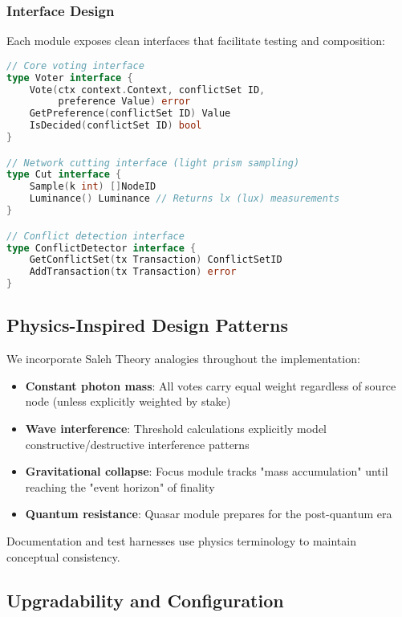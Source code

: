 \subsubsection{Interface Design}

Each module exposes clean interfaces that facilitate testing and composition:

\begin{lstlisting}[language=Go]
// Core voting interface
type Voter interface {
    Vote(ctx context.Context, conflictSet ID, 
         preference Value) error
    GetPreference(conflictSet ID) Value
    IsDecided(conflictSet ID) bool
}

// Network cutting interface (light prism sampling)
type Cut interface {
    Sample(k int) []NodeID
    Luminance() Luminance // Returns lx (lux) measurements
}

// Conflict detection interface
type ConflictDetector interface {
    GetConflictSet(tx Transaction) ConflictSetID
    AddTransaction(tx Transaction) error
}
\end{lstlisting}

\subsection{Physics-Inspired Design Patterns}

We incorporate Saleh Theory analogies throughout the implementation:

\begin{itemize}
\item \textbf{Constant photon mass}: All votes carry equal weight regardless of source node (unless explicitly weighted by stake)

\item \textbf{Wave interference}: Threshold calculations explicitly model constructive/destructive interference patterns

\item \textbf{Gravitational collapse}: Focus module tracks "mass accumulation" until reaching the "event horizon" of finality

\item \textbf{Quantum resistance}: Quasar module prepares for the post-quantum era
\end{itemize}

Documentation and test harnesses use physics terminology to maintain conceptual consistency.

\subsection{Upgradability and Configuration}

